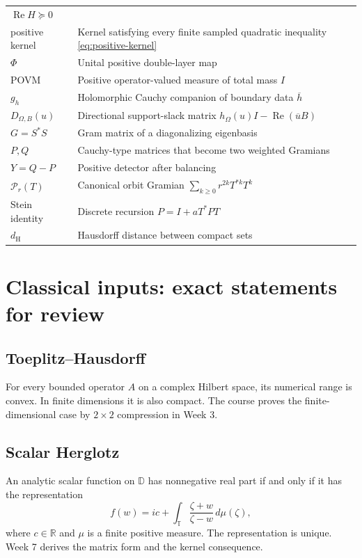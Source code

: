 \documentclass[11pt,oneside,openany]{book}
\theoremstyle{definition}
\theoremstyle{remark}
\newcommand{\R}{\mathbb R}
\newcommand{\D}{\mathbb D}
\newcommand{\Torus}{\mathbb T}
\newcommand{\RePart}{\operatorname{Re}}
\begin{document}
\begin{longtable}{@{}L{0.23\textwidth}L{0.68\textwidth}@{}}
\(\RePart H\succeq0\)\\
positive kernel&Kernel satisfying every finite sampled quadratic
inequality \eqref{eq:positive-kernel}\\
\(\Phi\)&Unital positive double-layer map\\
POVM&Positive operator-valued measure of total mass \(I\)\\
\(g_h\)&Holomorphic Cauchy companion of boundary data \(\overline h\)\\
\(D_{\Omega,B}(u)\)&Directional support-slack matrix
\(h_\Omega(u)I-\RePart(\overline uB)\)\\
\(G=S^*S\)&Gram matrix of a diagonalizing eigenbasis\\
\(P,Q\)&Cauchy-type matrices that become two weighted Gramians\\
\(Y=Q-P\)&Positive detector after balancing\\
\(\mathcal P_r(T)\)&Canonical orbit Gramian
\(\sum_{k\geq0}r^{2k}T^{*k}T^k\)\\
Stein identity&Discrete recursion \(P=I+aT^*PT\)\\
\(d_{\mathrm H}\)&Hausdorff distance between compact sets\\
\bottomrule
\end{longtable}

\chapter{Classical inputs: exact statements for review}
\label{app:classical-inputs}

\section{Toeplitz--Hausdorff}

For every bounded operator \(A\) on a complex Hilbert space, its
numerical range is convex.  In finite dimensions it is also compact.
The course proves the finite-dimensional case by \(2\times2\)
compression in Week 3.

\section{Scalar Herglotz}

An analytic scalar function on \(\D\) has nonnegative real part if and
only if it has the representation
\[
  f(w)=ic+\int_{\Torus}\frac{\zeta+w}{\zeta-w}\,d\mu(\zeta),
\]
where \(c\in\R\) and \(\mu\) is a finite positive measure.  The
representation is unique.  Week 7 derives the matrix form and the
kernel consequence.
\end{document}
